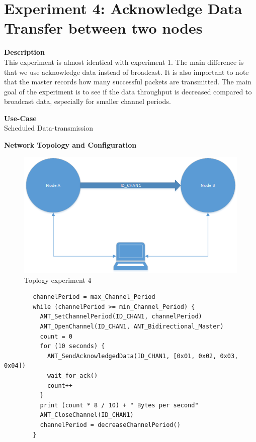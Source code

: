 \section{Experiment 4: Acknowledge Data Transfer between two nodes}
\begin{description} 
	\item{\textbf{Description}} \hfill \\ This experiment is almost identical with experiment 1. The main difference is that we use acknowledge data instead of broadcast. It is also important to note that the master records how many successful packets are transmitted. The main goal of the experiment is to see if the data throughput is decreased compared to broadcast data, especially for smaller channel periods.
	\item{\textbf{Use-Case}} \hfill \\ Scheduled Data-transmission
	\item{\textbf{Network Topology and Configuration}} \hfill \\
	\begin{figure}[H]
		\centering
		\includegraphics[scale=0.6]{./pics/exp1_topo.png}
		\caption{Toplogy experiment 4}
	\end{figure}
	\begin{code}[H]
		\begin{verbatim}
		channelPeriod = max_Channel_Period
		while (channelPeriod >= min_Channel_Period) {
		  ANT_SetChannelPeriod(ID_CHAN1, channelPeriod)
		  ANT_OpenChannel(ID_CHAN1, ANT_Bidirectional_Master)
		  count = 0
		  for (10 seconds) {
		    ANT_SendAcknowledgedData(ID_CHAN1, [0x01, 0x02, 0x03, 0x04])	   
		    wait_for_ack()
		    count++
		  }
		  print (count * 8 / 10) + " Bytes per second"	  
		  ANT_CloseChannel(ID_CHAN1)
		  channelPeriod = decreaseChannelPeriod()
		} 
		\end{verbatim}
		\caption{Acknowledge data transfer (Master)}\label{lst:mExp4}
	\end{code}
			

\end{description}
